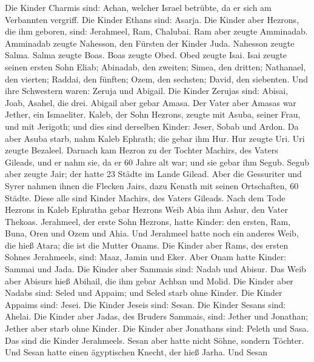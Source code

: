 Die Kinder Charmis sind: Achan, welcher Israel betrübte, da er sich am
Verbannten vergriff.  Die Kinder Ethans sind: Asarja.
 Die Kinder aber Hezrons, die ihm geboren, sind: Jerahmeel,
Ram, Chalubai.  Ram aber zeugte Amminadab. Amminadab zeugte
Nahesson, den Fürsten der Kinder Juda.  Nahesson zeugte
Salma. Salma zeugte Boas.  Boas zeugte Obed. Obed zeugte
Isai.  Isai zeugte seinen ersten Sohn Eliab; Abinadab, den
zweiten; Simea, den dritten;  Nathanael, den vierten;
Raddai, den fünften;  Ozem, den sechsten; David, den
siebenten.  Und ihre Schwestern waren: Zeruja und Abigail.
Die Kinder Zerujas sind: Abisai, Joab, Asahel, die drei. 
Abigail aber gebar Amasa. Der Vater aber Amasas war Jether, ein
Ismaeliter.  Kaleb, der Sohn Hezrons, zeugte mit Asuba,
seiner Frau, und mit Jerigoth; und dies sind derselben Kinder: Jeser,
Sobab und Ardon.  Da aber Asuba starb, nahm Kaleb Ephrath;
die gebar ihm Hur.  Hur zeugte Uri. Uri zeugte Bezaleel.
 Darnach kam Hezron zu der Tochter Machirs, des Vaters
Gileads, und er nahm sie, da er 60 Jahre alt war; und sie gebar ihm
Segub.  Segub aber zeugte Jair; der hatte 23 Städte im
Lande Gilead.  Aber die Gessuriter und Syrer nahmen ihnen
die Flecken Jairs, dazu Kenath mit seinen Ortschaften, 60 Städte. Diese
alle sind Kinder Machirs, des Vaters Gileads.  Nach dem
Tode Hezrons in Kaleb Ephratha gebar Hezrons Weib Abia ihm Ashur, den
Vater Thekoas.  Jerahmeel, der erste Sohn Hezrons, hatte
Kinder: den ersten, Ram, Buna, Oren und Ozem und Ahia.  Und
Jerahmeel hatte noch ein anderes Weib, die hieß Atara; die ist die
Mutter Onams.  Die Kinder aber Rams, des ersten Sohnes
Jerahmeels, sind: Maaz, Jamin und Eker.  Aber Onam hatte
Kinder: Sammai und Jada. Die Kinder aber Sammais sind: Nadab und Abisur.
 Das Weib aber Abisurs hieß Abihail, die ihm gebar Achban
und Molid.  Die Kinder aber Nadabs sind: Seled und Appaim;
und Seled starb ohne Kinder.  Die Kinder Appaims sind:
Jesei. Die Kinder Jeseis sind: Sesan. Die Kinder Sesans sind: Ahelai.
 Die Kinder aber Jadas, des Bruders Sammais, sind: Jether
und Jonathan; Jether aber starb ohne Kinder.  Die Kinder
aber Jonathans sind: Peleth und Sasa. Das sind die Kinder Jerahmeels.
 Sesan aber hatte nicht Söhne, sondern Töchter. Und Sesan
hatte einen ägyptischen Knecht, der hieß Jarha.  Und Sesan
